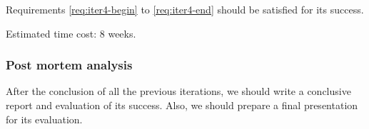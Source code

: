 Requirements \ref{req:iter4-begin} to \ref{req:iter4-end} should be
satisfied for its success.

Estimated time cost: 8 weeks.

\subsubsection{Post mortem analysis}

After the conclusion of all the previous iterations, we should write a
conclusive report and evaluation of its success. Also, we should
prepare a final presentation for its evaluation.

